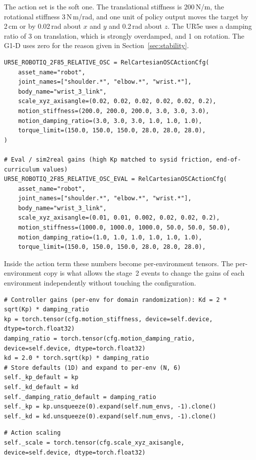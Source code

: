 The action set is the soft one. The translational stiffness is 200\,N/m, the rotational stiffness 3\,N\,m/rad, and one unit of policy output moves the target by 2\,cm or by 0.02\,rad about $x$ and $y$ and 0.2\,rad about $z$. The UR5e uses a damping ratio of 3 on translation, which is strongly overdamped, and 1 on rotation. The G1-D uses zero for the reason given in Section~\ref{sec:stability}.

\begin{snippetbox}[11]
\begin{lstlisting}[firstnumber=15]
UR5E_ROBOTIQ_2F85_RELATIVE_OSC = RelCartesianOSCActionCfg(
    asset_name="robot",
    joint_names=["shoulder.*", "elbow.*", "wrist.*"],
    body_name="wrist_3_link",
    scale_xyz_axisangle=(0.02, 0.02, 0.02, 0.02, 0.02, 0.2),
    motion_stiffness=(200.0, 200.0, 200.0, 3.0, 3.0, 3.0),
    motion_damping_ratio=(3.0, 3.0, 3.0, 1.0, 1.0, 1.0),
    torque_limit=(150.0, 150.0, 150.0, 28.0, 28.0, 28.0),
)

# Eval / sim2real gains (high Kp matched to sysid friction, end-of-curriculum values)
UR5E_ROBOTIQ_2F85_RELATIVE_OSC_EVAL = RelCartesianOSCActionCfg(
    asset_name="robot",
    joint_names=["shoulder.*", "elbow.*", "wrist.*"],
    body_name="wrist_3_link",
    scale_xyz_axisangle=(0.01, 0.01, 0.002, 0.02, 0.02, 0.2),
    motion_stiffness=(1000.0, 1000.0, 1000.0, 50.0, 50.0, 50.0),
    motion_damping_ratio=(1.0, 1.0, 1.0, 1.0, 1.0, 1.0),
    torque_limit=(150.0, 150.0, 150.0, 28.0, 28.0, 28.0),
\end{lstlisting}
\end{snippetbox}

Inside the action term these numbers become per-environment tensors. The per-environment copy is what allows the stage~2 events to change the gains of each environment independently without touching the configuration.

\begin{snippetbox}[11]
\begin{lstlisting}[firstnumber=64]
# Controller gains (per-env for domain randomization): Kd = 2 * sqrt(Kp) * damping_ratio
kp = torch.tensor(cfg.motion_stiffness, device=self.device, dtype=torch.float32)
damping_ratio = torch.tensor(cfg.motion_damping_ratio, device=self.device, dtype=torch.float32)
kd = 2.0 * torch.sqrt(kp) * damping_ratio
# Store defaults (1D) and expand to per-env (N, 6)
self._kp_default = kp
self._kd_default = kd
self._damping_ratio_default = damping_ratio
self._kp = kp.unsqueeze(0).expand(self.num_envs, -1).clone()
self._kd = kd.unsqueeze(0).expand(self.num_envs, -1).clone()
\end{lstlisting}
\snippetelide
\begin{lstlisting}[firstnumber=94]
# Action scaling
self._scale = torch.tensor(cfg.scale_xyz_axisangle, device=self.device, dtype=torch.float32)
\end{lstlisting}
\end{snippetbox}

